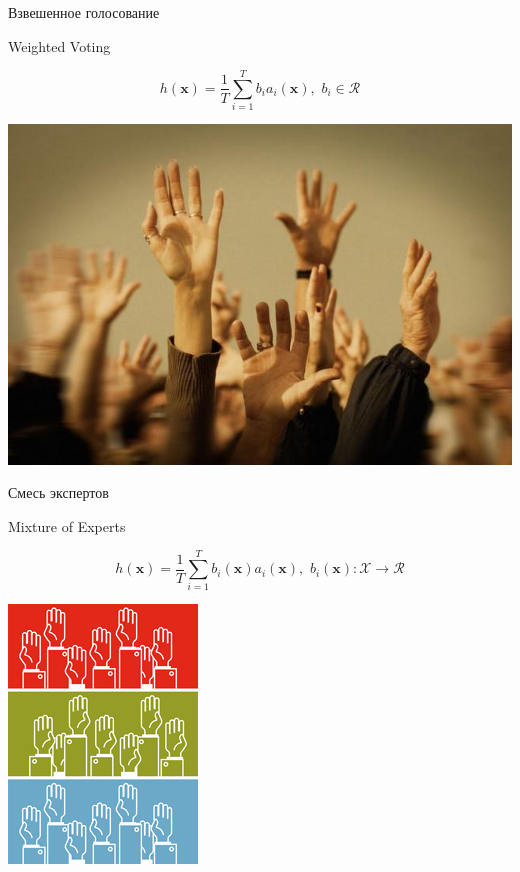 \documentclass[10pt]{beamer}
\begin{document}
\begin{frame}{Взвешенное голосование}
\begin{block}{Weighted Voting}
\end{block}
\[
    h(\mathbf{x}) = \frac{1}{T} \sum \limits_{i=1}^{T}b_i a_i(\mathbf{x}), \,\,
    b_i \in \mathcal{R}
\]
\begin{center}
    \includegraphics[scale=0.6]{images/wvoting.jpg}
\end{center}

\end{frame}

\begin{frame}{Смесь экспертов}
\begin{block}{Mixture of Experts}
\end{block}
\[
    h(\mathbf{x}) = \frac{1}{T} \sum \limits_{i=1}^{T}b_i(\mathbf{x}) a_i(\mathbf{x}), \,\,
    b_i(\mathbf{x}): \mathcal{X} \rightarrow \mathcal{R}
\]
\begin{center}
    \includegraphics[scale=0.6]{images/mixtureofexperts.jpg}
\end{center}
\end{frame}
\end{document}
